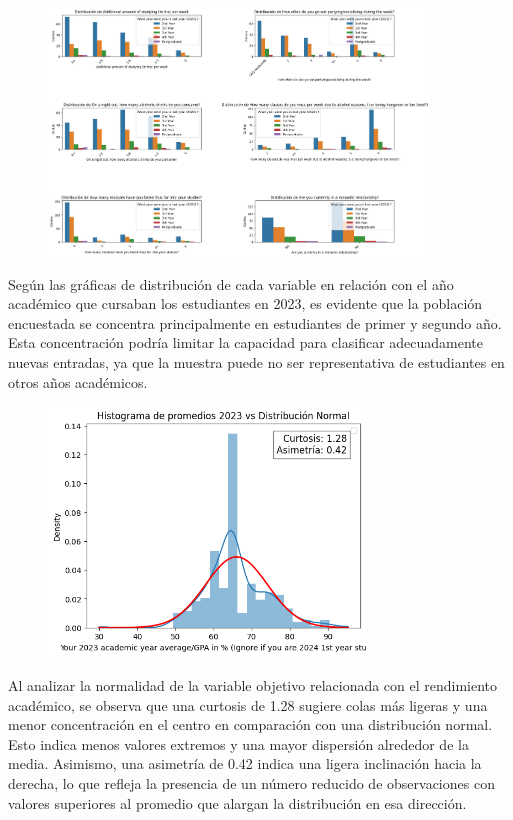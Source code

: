 \documentclass[a4paper,12pt]{article}
\begin{document}
\begin{figure}[H]
  \centering
  \includegraphics[width=0.9\textwidth]{output3.png}
\end{figure}

Según las gráficas de distribución de cada variable en relación con el año académico que cursaban los estudiantes en 2023, es evidente que la población encuestada se concentra principalmente en estudiantes de primer y segundo año. Esta concentración podría limitar la capacidad para clasificar adecuadamente nuevas entradas, ya que la muestra puede no ser representativa de estudiantes en otros años académicos.

\begin{figure}[H]
  \centering
  \includegraphics[width=0.75\textwidth]{output4.png}
\end{figure}

Al analizar la normalidad de la variable objetivo relacionada con el rendimiento académico, se observa que una curtosis de 1.28 sugiere colas más ligeras y una menor concentración en el centro en comparación con una distribución normal. Esto indica menos valores extremos y una mayor dispersión alrededor de la media. Asimismo, una asimetría de 0.42 indica una ligera inclinación hacia la derecha, lo que refleja la presencia de un número reducido de observaciones con valores superiores al promedio que alargan la distribución en esa dirección.
\end{document}

